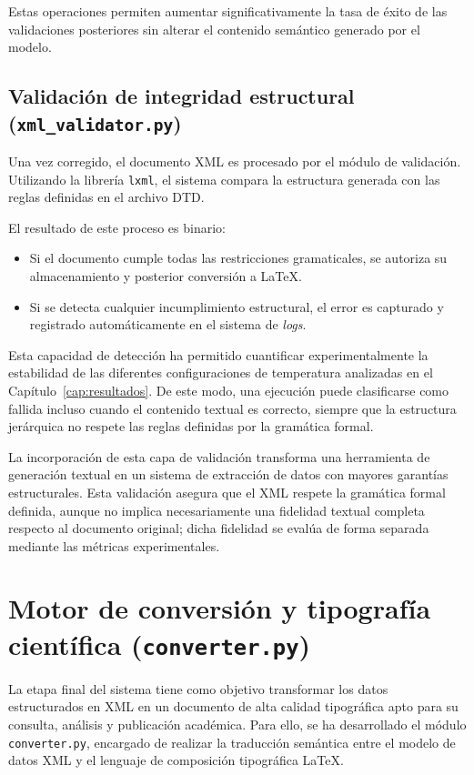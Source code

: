 Estas operaciones permiten aumentar significativamente la tasa de éxito de las validaciones posteriores sin alterar el contenido semántico generado por el modelo.

\subsection{Validación de integridad estructural (\texttt{xml\_validator.py})}

Una vez corregido, el documento XML es procesado por el módulo de validación. Utilizando la librería \texttt{lxml}, el sistema compara la estructura generada con las reglas definidas en el archivo DTD.

El resultado de este proceso es binario:

\begin{itemize}
    \item Si el documento cumple todas las restricciones gramaticales, se autoriza su almacenamiento y posterior conversión a \LaTeX.

    \item Si se detecta cualquier incumplimiento estructural, el error es capturado y registrado automáticamente en el sistema de \textit{logs}.
\end{itemize}

Esta capacidad de detección ha permitido cuantificar experimentalmente la estabilidad de las diferentes configuraciones de temperatura analizadas en el Capítulo~\ref{cap:resultados}. De este modo, una ejecución puede clasificarse como fallida incluso cuando el contenido textual es correcto, siempre que la estructura jerárquica no respete las reglas definidas por la gramática formal.

La incorporación de esta capa de validación transforma una herramienta de generación textual en un sistema de extracción de datos con mayores garantías estructurales. Esta validación asegura que el XML respete la gramática formal definida, aunque no implica necesariamente una fidelidad textual completa respecto al documento original; dicha fidelidad se evalúa de forma separada mediante las métricas experimentales.

\section{Motor de conversión y tipografía científica (\texttt{converter.py})}

La etapa final del sistema tiene como objetivo transformar los datos estructurados en XML en un documento de alta calidad tipográfica apto para su consulta, análisis y publicación académica. Para ello, se ha desarrollado el módulo \texttt{converter.py}, encargado de realizar la traducción semántica entre el modelo de datos XML y el lenguaje de composición tipográfica \LaTeX.

